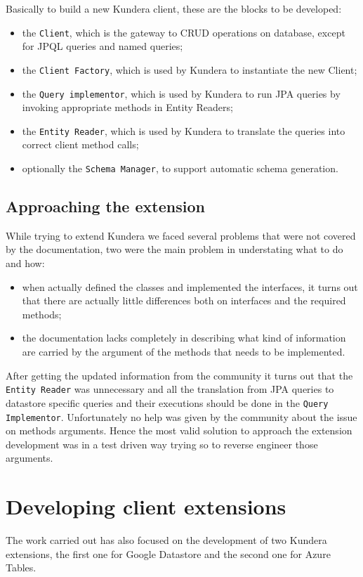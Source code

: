 \newparagraph Basically to build a new Kundera client, these are the blocks to be developed:
\begin{itemize}
\item the \texttt{Client}, which is the gateway to CRUD operations on database, except for JPQL queries and named queries;
\item the \texttt{Client Factory}, which is used by Kundera to instantiate the new Client;
\item the \texttt{Query implementor}, which is used by Kundera to run JPA queries by invoking appropriate methods in Entity Readers;
\item the \texttt{Entity Reader}, which is used by Kundera to translate the queries into correct client method calls;
\item optionally the \texttt{Schema Manager}, to support automatic schema generation.
\end{itemize}

\subsection{Approaching the extension}
While trying to extend Kundera we faced several problems that were not covered by the documentation, two were the main problem in understating what to do and how:
\begin{itemize}
\item when actually defined the classes and implemented the interfaces, it turns out that there are actually little differences both on interfaces and the required methods; 
\item the documentation lacks completely in describing what kind of information are carried by the argument of the methods that needs to be implemented.
\end{itemize} 

\noindent After getting the updated information from the community it turns out that the \texttt{Entity Reader} was unnecessary and all the translation from JPA queries to datastore specific queries and their executions should be done in the \texttt{Query Implementor}.  
Unfortunately no help was given by the community about the issue on methods arguments. Hence the most valid solution to approach the extension development was in a test driven way trying so to reverse engineer those arguments.

\section{Developing client extensions}
\label{sec:develop}
The work carried out has also focused on the development of two Kundera extensions, the first one for Google Datastore and the second one for Azure Tables.

